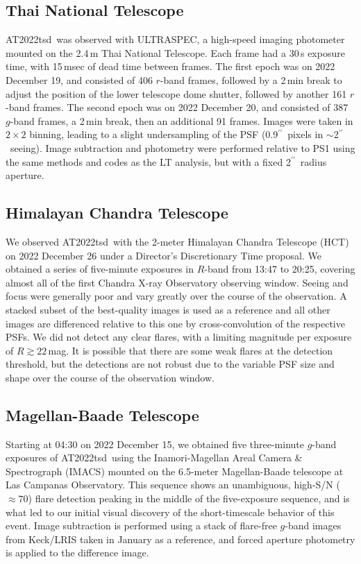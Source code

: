 \documentclass{nature_plusfigure}
\newcommand{\at}{AT2022tsd}
\newcommand{\arcsec}{$^{\prime\prime}$}
\begin{document}
\begin{methods}
\subsection{Thai National Telescope}

\at\ was observed with ULTRASPEC\cite{Dhillon2014}, a high-speed imaging photometer mounted on the 2.4\,m Thai National Telescope. Each frame had a 30\,s exposure time, with 15\,msec of dead time between frames. The first epoch was on 2022 December 19, and consisted of 406 $r$-band frames, followed by a 2\,min break to adjust the position of the lower telescope dome shutter, followed by another 161 $r$-band frames. The second epoch was on 2022 December 20, and consisted of 387 $g$-band frames, a 2\,min break, then an additional 91 frames.  Images were taken in $2\times2$ binning, leading to a slight undersampling of the PSF (0.9\arcsec\ pixels in $\sim$2\arcsec\ seeing).  Image subtraction and photometry were performed relative to PS1 using the same methods and codes as the LT analysis, but with a fixed 2\arcsec\ radius aperture.

\subsection{Himalayan Chandra Telescope}
\label{sec:HCT}

We observed \at\ with the 2-meter Himalayan Chandra Telescope (HCT) on 2022 December 26 under a Director's Discretionary Time proposal. We obtained a series of five-minute exposures in $R$-band from 13:47 to 20:25, covering almost all of the first Chandra X-ray Observatory observing window.  Seeing and focus were generally poor and vary greatly over the course of the observation.  A stacked subset of the best-quality images is used as a reference and all other images are differenced relative to this one by cross-convolution of the respective PSFs.   We did not detect any clear flares, with a limiting magnitude per exposure of $R\gtrsim22\,$mag. It is possible that there are some weak flares at the detection threshold, but the detections are not robust due to the variable PSF size and shape over the course of the observation window.

\subsection{Magellan-Baade Telescope}
\label{sec:magellan}

Starting at 04:30 on 2022 December 15, we obtained five three-minute $g$-band exposures of \at\ using the Inamori-Magellan Areal Camera \& Spectrograph (IMACS\cite{Dressler2011}) mounted on the 6.5-meter Magellan-Baade telescope at Las Campanas Observatory.  This sequence shows an unambiguous, high-S/N ($\approx70$) flare detection peaking in the middle of the five-exposure sequence, and is what led to our initial visual discovery of the short-timescale behavior of this event.  Image subtraction is performed using a stack of flare-free $g$-band images from Keck/LRIS taken in January as a reference, and forced aperture photometry is applied to the difference image.


\end{methods}
\end{document}
